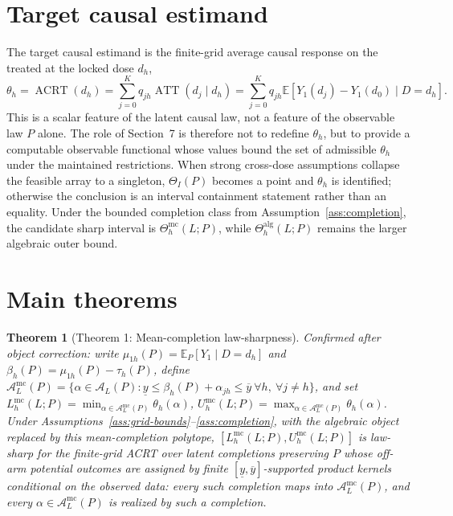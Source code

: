 \documentclass[11pt]{article}
\newcommand{\E}{\mathbb{E}}
\theoremstyle{definition}
\theoremstyle{plain}
\newtheorem{theorem}{Theorem}
\theoremstyle{remark}
\begin{document}
\section{Target causal estimand}
The target causal estimand is the finite-grid average causal response on the
treated at the locked dose \(d_h\),
\[
  \theta_h=\operatorname{ACRT}(d_h)
  =\sum_{j=0}^K q_{jh}\operatorname{ATT}(d_j\mid d_h)
  =\sum_{j=0}^K q_{jh}\E[Y_1(d_j)-Y_1(d_0)\mid D=d_h].
\]
This is a scalar feature of the latent causal law, not a feature of the
observable law \(P\) alone.  The role of Section~7 is therefore not to redefine
\(\theta_h\), but to provide a computable observable functional whose values
bound the set of admissible \(\theta_h\) under the maintained restrictions.
When strong cross-dose assumptions collapse the feasible array to a singleton,
\(\Theta_I(P)\) becomes a point and \(\theta_h\) is identified; otherwise the
conclusion is an interval containment statement rather than an equality.  Under
the bounded completion class from Assumption~\ref{ass:completion}, the
candidate sharp interval is \(\Theta_h^{\mathrm{mc}}(L;P)\), while
\(\Theta_h^{\mathrm{alg}}(L;P)\) remains the larger algebraic outer bound.

\section{Main theorems}
\begin{theorem}[Theorem 1: Mean-completion law-sharpness]\label{prop:law-sharp-mended}\label{conj:law-sharp}
Confirmed after object correction: write \(\mu_{1h}(P)=\E_P[Y_1\mid D=d_h]\) and \(\beta_h(P)=\mu_{1h}(P)-\tau_h(P)\), define \(\mathcal A_L^{\mathrm{mc}}(P)=\{\alpha\in\mathcal A_L(P):\underline y\le \beta_h(P)+\alpha_{jh}\le\overline y\ \forall h,\ \forall j\ne h\}\), and set \(L_h^{\mathrm{mc}}(L;P)=\min_{\alpha\in\mathcal A_L^{\mathrm{mc}}(P)}\theta_h(\alpha)\), \(U_h^{\mathrm{mc}}(L;P)=\max_{\alpha\in\mathcal A_L^{\mathrm{mc}}(P)}\theta_h(\alpha)\). Under Assumptions~\ref{ass:grid-bounds}--\ref{ass:completion}, with the algebraic object replaced by this mean-completion polytope, \([L_h^{\mathrm{mc}}(L;P),U_h^{\mathrm{mc}}(L;P)]\) is law-sharp for the finite-grid ACRT over latent completions preserving \(P\) whose off-arm potential outcomes are assigned by finite \([\underline y,\overline y]\)-supported product kernels conditional on the observed data: every such completion maps into \(\mathcal A_L^{\mathrm{mc}}(P)\), and every \(\alpha\in\mathcal A_L^{\mathrm{mc}}(P)\) is realized by such a completion.
\end{theorem}
\end{document}
